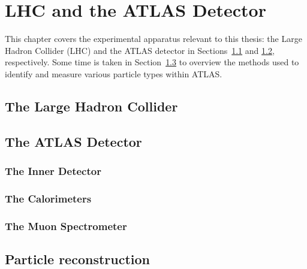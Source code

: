 \chapter[LHC and the ATLAS Detector][LHC and the ATLAS Detector]{LHC and the ATLAS Detector}
\label{ch:detector}
This chapter covers the experimental apparatus relevant to this thesis: the Large Hadron Collider (LHC) and the ATLAS detector in Sections~\ref{sec:lhc} and \ref{sec:atlas}, respectively.
Some time is taken in Section~\ref{sec:reconstruction} to overview the methods used to identify and measure various particle types within ATLAS.

\section{The Large Hadron Collider}\label{sec:lhc}


\section{The ATLAS Detector}\label{sec:atlas}


\subsection{The Inner Detector}\label{sec:id}


\subsection{The Calorimeters}\label{sec:calorimeters}


\subsection{The Muon Spectrometer}\label{sec:muon_spectrometer}


\section{Particle reconstruction}\label{sec:reconstruction}

